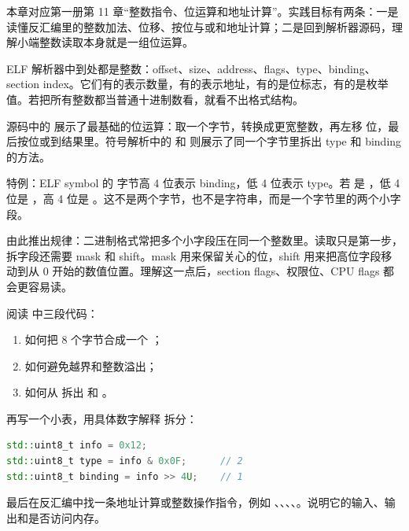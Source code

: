 
本章对应第一册第 11 章“整数指令、位运算和地址计算”。实践目标有两条：一是读懂反汇编里的整数加法、位移、按位与或和地址计算；二是回到解析器源码，理解小端整数读取本身就是一组位运算。


ELF 解析器中到处都是整数：offset、size、address、flags、type、binding、section index。它们有的表示数量，有的表示地址，有的是位标志，有的是枚举值。若把所有整数都当普通十进制数看，就看不出格式结构。

源码中的  展示了最基础的位运算：取一个字节，转换成更宽整数，再左移  位，最后按位或到结果里。符号解析中的  和  则展示了同一个字节里拆出 type 和 binding 的方法。


特例：ELF symbol 的  字节高 4 位表示 binding，低 4 位表示 type。若  是 ，低 4 位是 ，高 4 位是 。这不是两个字节，也不是字符串，而是一个字节里的两个小字段。

由此推出规律：二进制格式常把多个小字段压在同一个整数里。读取只是第一步，拆字段还需要 mask 和 shift。mask 用来保留关心的位，shift 用来把高位字段移动到从 0 开始的数值位置。理解这一点后，section flags、权限位、CPU flags 都会更容易读。


阅读  中三段代码：

\begin{enumerate}
  \item {} 如何把 8 个字节合成一个 ；
  \item {} 如何避免越界和整数溢出；
  \item {} 如何从  拆出  和 。
\end{enumerate}

再写一个小表，用具体数字解释  拆分：

\begin{lstlisting}[language=C++]
std::uint8_t info = 0x12;
std::uint8_t type = info & 0x0F;      // 2
std::uint8_t binding = info >> 4U;    // 1
\end{lstlisting}

最后在反汇编中找一条地址计算或整数操作指令，例如 、、、、。说明它的输入、输出和是否访问内存。

